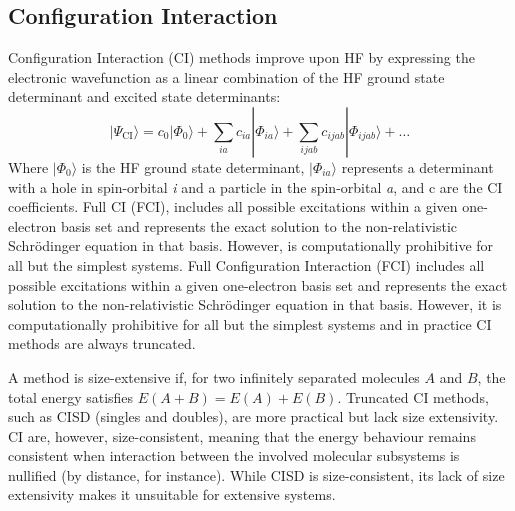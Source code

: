 \subsection{Configuration Interaction}
Configuration Interaction (CI)\cite{shavitt2009many,sherrill1999configuration} methods improve upon HF by expressing the electronic wavefunction as a linear combination of the HF ground state determinant and excited state determinants:
\begin{equation} \label{eq:CI}
     |\Psi_{\mathrm{CI}} \rangle = c_0 |\Phi_0 \rangle + \sum_{ia} c_{ia} |\Phi_{ia} \rangle + \sum_{ijab} c_{ijab} |\Phi_{ijab} \rangle + \dots
\end{equation}
Where $|\Phi_0 \rangle$ is the HF ground state determinant, $|\Phi_{ia} \rangle$ represents a determinant with a hole in spin-orbital \textit{i} and a particle in the spin-orbital \textit{a}, and c are the CI coefficients. Full CI (FCI),  includes all possible excitations within a given one-electron basis set and represents the exact solution to the non-relativistic Schrödinger equation in that basis. However, is computationally prohibitive for all but the simplest systems. Full Configuration Interaction (FCI) includes all possible excitations within a given one-electron basis set and represents the exact solution to the non-relativistic Schrödinger equation in that basis. However, it is computationally prohibitive for all but the simplest systems and in practice CI methods are always truncated. 

A method is size-extensive if, for two infinitely separated molecules $A$ and $B$, the total energy satisfies $E(A + B) = E(A) + E(B)$. Truncated CI methods, such as CISD (singles and doubles), are more practical but lack size extensivity.
CI are, however, size-consistent, meaning that the energy behaviour remains consistent when interaction between the involved molecular subsystems is nullified (by distance, for instance). While CISD is size-consistent, its lack of size extensivity makes it unsuitable for extensive systems.

